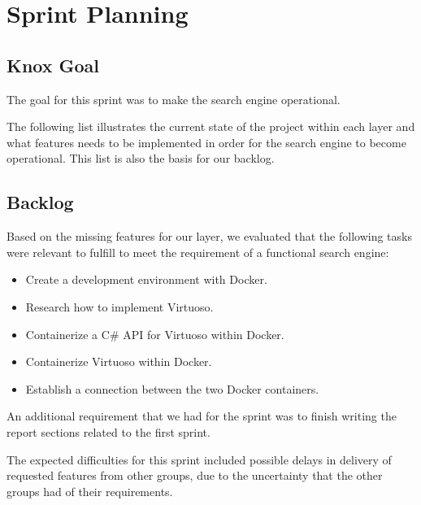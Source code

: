 \section{Sprint Planning}
\subsection*{Knox Goal}
The goal for this sprint was to make the search engine operational.

The following list illustrates the current state of the \knox{} project within each layer and what features needs to be implemented in order for the search engine to become operational. This list is also the basis for our backlog.



\subsection*{Backlog}
Based on the missing features for our layer, we evaluated that the following tasks were relevant to fulfill to meet the requirement of a functional search engine:
\begin{itemize}
    \item Create a development environment with Docker.
    \item Research how to implement Virtuoso.
    \item Containerize a C\# API for Virtuoso within Docker.
    \item Containerize Virtuoso within Docker.
    \item Establish a connection between the two Docker containers.
\end{itemize}

An additional requirement that we had for the sprint was to finish writing the report sections related to the first \knox{} sprint.

The expected difficulties for this sprint included possible delays in delivery of requested features from other groups, due to the uncertainty that the other groups had of their requirements. 


